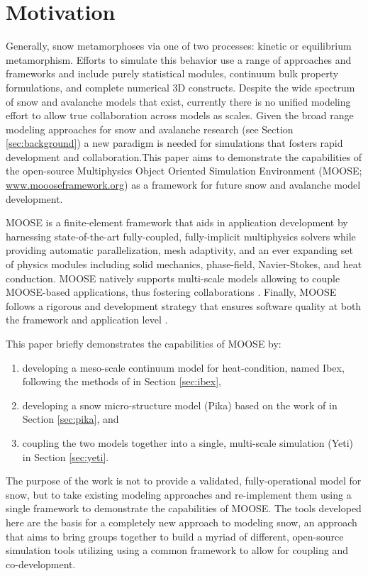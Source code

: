 \section{Motivation}\label{sec:motivation}
Generally, snow metamorphoses via one of two processes: kinetic or equilibrium metamorphism. Efforts to simulate this behavior use a range of approaches and frameworks and include purely statistical modules, continuum bulk property formulations, and complete numerical 3D constructs. Despite the wide spectrum of snow and avalanche models that exist, currently there is no unified modeling effort to allow true collaboration across models as scales. Given the broad range modeling approaches for snow and avalanche research (see Section \ref{sec:background}) a new paradigm is needed for simulations that fosters rapid development and collaboration.\authorcorrespond This paper aims to demonstrate the capabilities of the open-source Multiphysics Object Oriented Simulation Environment (MOOSE; \url{www.moooseframework.org}) as a framework for future snow and avalanche model development.

MOOSE is a finite-element framework that aids in application development by harnessing state-of-the-art fully-coupled, fully-implicit multiphysics solvers while providing automatic parallelization, mesh adaptivity, and an ever expanding set of physics modules including solid mechanics, phase-field, Navier-Stokes, and heat conduction. MOOSE natively supports multi-scale models allowing to couple MOOSE-based applications, thus fostering collaborations \citep{gaston2014physics}. Finally, MOOSE follows a rigorous and development strategy that ensures software quality at both the framework and application level \citep{gaston2014continous}.

This paper briefly demonstrates the capabilities of MOOSE by:
\begin{enumerate}\setlength{\itemsep}{0pt}
\item developing a meso-scale continuum model for heat-condition, named Ibex, following the methods of \citet{slaughter2010numerical} in Section \ref{sec:ibex},
\item developing a snow micro-structure model (Pika) based on the work of \citet{kaempfer2009phase} in Section \ref{sec:pika}, and
\item coupling the two models together into a single, multi-scale simulation (Yeti) in Section \ref{sec:yeti}.
\end{enumerate}

The purpose of the work is not to provide a validated, fully-operational model for snow, but to take existing modeling approaches and re-implement them using a single framework to demonstrate the capabilities of MOOSE. The tools developed here are the basis for a completely new approach to modeling snow, an approach that aims to bring groups together to build a myriad of different, open-source simulation tools utilizing using a common framework to allow for coupling and co-development.


